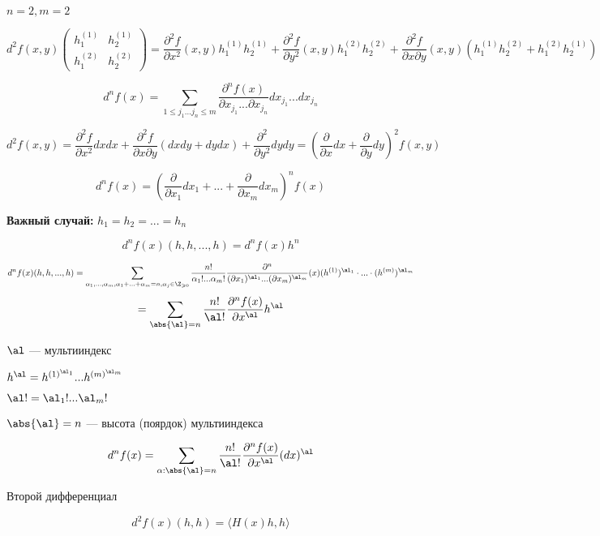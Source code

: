 $
    n = 2, m = 2
$

\[
    d ^ 2 f(x, y) \begin{pmatrix}
        h_1^{(1)}&h_2^{(1)}\\
        h_1^{(2)}&h_2^{(2)}
    \end{pmatrix} = 
    \frac{\partial ^ 2 f}{\partial x ^ 2}(x, y) h_1^{(1)} h_2^{(1)} +
    \frac{\partial ^ 2 f}{\partial y ^ 2}(x, y)
    h_1^{(2)} h_2^{(2)} +
    \frac{\partial ^ 2 f}{\partial x \partial y} (x, y) (h_1 ^ {(1)} h_2 ^ {(2)} + h_1 ^ {(2)} h_2 ^ {(1)})
\]

\[
    d^n  f(x) = \sum_{1 \leqslant j_1 ... j_n \leqslant m} \frac{\partial ^ n f(x)}{\partial x_{j_1} ... \partial x_{j_n}} d x_{j_1} ... dx_{j_n}
\]

\[
    d ^ 2 f(x, y) = \frac{\partial ^ 2 f}{\partial x ^ 2} dx dx + \frac{\partial^2 f}{\partial x \partial y }(dx dy + dy dx) + \frac{\partial ^ 2 }{\partial y ^ 2}  dy dy =
    \left (\frac{\partial}{\partial x} dx + \frac{\partial }{\partial y} dy \right) ^ 2 f(x, y)
\]

\[
    d^n f(x) = \left( \frac{\partial}{\partial x_1} dx_1 + ... + \frac{\partial}{\partial x_m} dx_m  \right) ^ n f(x)
\]

\quad

\textbf{Важный случай:}  $h_1 = h_2 = ... = h_n$

\[
    d ^ n f(x) (h, h, ..., h) = d ^ n f(x) h ^ n
\]

\[
    d ^ n f(x) (h, h, ..., h) = \sum_{\alpha_1, ..., \alpha_m, \alpha_1 + ... + \alpha_m = n, \alpha_j \in \Z_{\geqslant 0}} \frac{n !}{\alpha_1 ! ... \alpha_m !}
     \frac{\partial ^ n}{(\partial x_1) ^ {\al_1} ... (\partial x_m) ^ {\al_m}} (x) (h ^ {(1)}) ^ {\al_1} \cdot ... \cdot (h ^ {(m)}) ^ {\al_m}
\]
\[     
	 = \sum_{\abs{\al} = n} \frac{n !}{\al !} \frac{\partial ^ n f(x)}{\partial x ^ \al} h ^ \al
\]

$\al$ --- мультииндекс

$h^\al = h^{(1)^{\al_1}} ... h^{(m)^{\al_m}}$

$\al ! = \al_1 ! ... \al_m !$

$\abs{\al} = n$ --- высота (поярдок) мультииндекса

\[
    d ^ n f(x) = \sum_{\alpha : \abs{\al} = n}
    \frac{n !}{\al !} \frac{\partial ^ n f(x)}{\partial x ^ \al} (dx) ^ \al
\]

Второй дифференциал

\[
    d ^ 2 f(x) (h, h) = \langle H(x) h, h \rangle
\]

